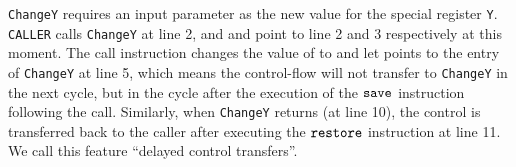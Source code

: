 
\texttt{ChangeY} requires an input parameter
as the new value for the special register {\tt Y}.
\texttt{CALLER} calls \texttt{ChangeY} at line 2,
and \pc{} and \npc{} point to line 2 and 3 respectively at this
moment.
The call instruction changes the value of \pc{} to \npc{}
and let \npc{} points to the entry of 
\texttt{ChangeY} at line 5,
which means the control-flow will not transfer to \texttt{ChangeY}
in the next cycle,
but in the cycle after the execution of the $\texttt{save}$
instruction following the call. Similarly, when
\texttt{ChangeY} returns (at line 10), the control is transferred
back to the caller after executing the $\texttt{restore}$
instruction at line 11.
We call this feature ``delayed control transfers''.

